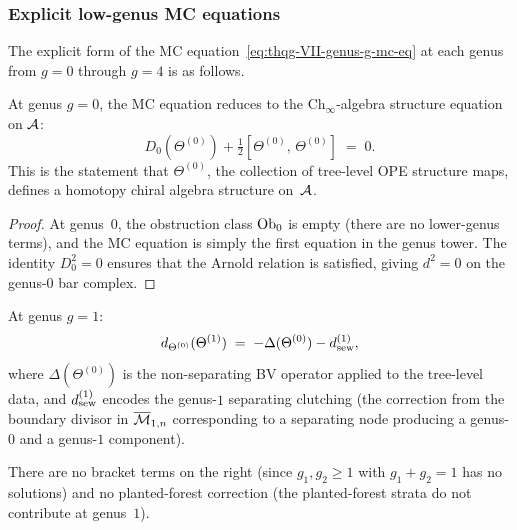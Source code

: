 \subsubsection{Explicit low-genus MC equations}
\label{subsubsec:thqg-VII-low-genus}

The explicit form of the MC
equation~\eqref{eq:thqg-VII-genus-g-mc-eq} at each genus
from $g = 0$ through $g = 4$ is as follows.

\begin{proposition}
\label{prop:thqg-VII-genus0}
At genus $g = 0$, the MC equation reduces to the $\mathrm{Ch}_\infty$-algebra
structure equation on $\mathcal{A}$:
\begin{equation}\label{eq:thqg-VII-mc-g0}
D_0(\Theta^{(0)})
+ \tfrac{1}{2}[\Theta^{(0)},\, \Theta^{(0)}]
\;=\; 0.
\end{equation}
This is the statement that $\Theta^{(0)}$, the collection of
tree-level OPE structure maps, defines a homotopy chiral algebra
structure on~$\mathcal{A}$.
\end{proposition}

\begin{proof}
At genus~$0$, the obstruction class $\mathrm{Ob}_0$ is empty (there are no
lower-genus terms), and the MC equation is simply the first equation
in the genus tower. The identity $D_0^2 = 0$ ensures that the
Arnold relation is satisfied, giving $d^2 = 0$ on the genus-$0$
bar complex.
\end{proof}

\begin{proposition}
\label{prop:thqg-VII-genus1}
At genus $g = 1$:
\begin{equation}\label{eq:thqg-VII-mc-g1}
d_{\Theta^{(0)}}(\Theta^{(1)})
\;=\;
-\Delta(\Theta^{(0)})
- d_{\mathrm{sew}}^{(1)},
\end{equation}
where $\Delta(\Theta^{(0)})$ is the non-separating BV operator
applied to the tree-level data, and $d_{\mathrm{sew}}^{(1)}$ encodes the
genus-$1$ separating clutching (the correction from the boundary
divisor in $\overline{\mathcal{M}}_{1,n}$ corresponding to a separating
node producing a genus-$0$ and a genus-$1$ component).

There are no bracket terms on the right
(since $g_1, g_2 \geq 1$ with $g_1 + g_2 = 1$ has no solutions)
and no planted-forest correction (the planted-forest
strata do not contribute at genus~$1$).
\end{proposition}

